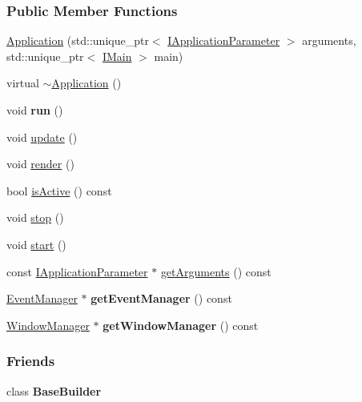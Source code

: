 \subsubsection*{Public Member Functions}
\begin{DoxyCompactItemize}
\item 
\hyperlink{a00002_a8ba1a5c0ffacfa8c22797d62722f1359}{Application} (std\+::unique\+\_\+ptr$<$ \hyperlink{a00043}{I\+Application\+Parameter} $>$ arguments, std\+::unique\+\_\+ptr$<$ \hyperlink{a00045}{I\+Main} $>$ main)
\item 
virtual \hyperlink{a00002_a02c92008318072312a4f972298c77246}{$\sim$\+Application} ()
\item 
void {\bfseries run} ()\hypertarget{a00002_a6d9c94380f1451664ff6d09c314671c7}{}\label{a00002_a6d9c94380f1451664ff6d09c314671c7}

\item 
void \hyperlink{a00002_a149822f20163e98d41728f4752d7a7f7}{update} ()
\item 
void \hyperlink{a00002_af3ef70b1c3e25be0dbe68c460ec2db98}{render} ()
\item 
bool \hyperlink{a00002_a86f249cf621c4255df1a60987c588961}{is\+Active} () const 
\item 
void \hyperlink{a00002_aeb61beceae055e7681b6791dd5dddafa}{stop} ()
\item 
void \hyperlink{a00002_a9b8b10fd48e93db0986df610523105dc}{start} ()
\item 
const \hyperlink{a00043}{I\+Application\+Parameter} $\ast$ \hyperlink{a00002_af165b483b86469ff9db2f689f1212f14}{get\+Arguments} () const 
\item 
\hyperlink{a00034}{Event\+Manager} $\ast$ {\bfseries get\+Event\+Manager} () const \hypertarget{a00002_aa895c5c2a56efe782cd9cb038075bb60}{}\label{a00002_aa895c5c2a56efe782cd9cb038075bb60}

\item 
\hyperlink{a00087}{Window\+Manager} $\ast$ {\bfseries get\+Window\+Manager} () const \hypertarget{a00002_aed35eca596bce4c089aa3db72d3dc5b6}{}\label{a00002_aed35eca596bce4c089aa3db72d3dc5b6}

\end{DoxyCompactItemize}
\subsubsection*{Friends}
\begin{DoxyCompactItemize}
\item 
class {\bfseries Base\+Builder}\hypertarget{a00002_ad579f1883f887a1593ef8d2161435124}{}\label{a00002_ad579f1883f887a1593ef8d2161435124}

\end{DoxyCompactItemize}


